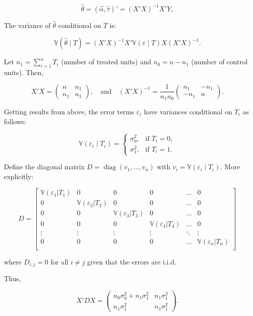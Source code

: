 \documentclass{article}
\begin{document}
\[
\hat{\theta} = (\hat{\alpha}, \hat{\tau})' = (X'X)^{-1} X'Y,
\]

The variance of \(\hat{\theta}\) conditional on \(T\) is:

\[
\mathbb{V}(\hat{\theta} \mid T) = (X'X)^{-1} X' \mathbb{V}(\varepsilon \mid T) X (X'X)^{-1}.
\]

Let \(n_1 = \sum_{i=1}^n T_i\) (number of treated units) and \(n_0 = n - n_1\) (number of control units). Then,

\[
X'X = \begin{pmatrix}
n & n_1 \\
n_1 & n_1
\end{pmatrix}, \quad \text{and} \quad (X'X)^{-1} = \frac{1}{n_1 n_0} \begin{pmatrix}
n_1 & -n_1 \\
- n_1 & n
\end{pmatrix}.
\]

Getting results from above, the error terms \(\varepsilon_i\) have variances conditional on \(T_i\) as follows:

\[
\mathbb{V}(\varepsilon_i \mid T_i) = \begin{cases}
\sigma_0^2, & \text{if } T_i = 0, \\
\sigma_1^2, & \text{if } T_i = 1.
\end{cases}
\]

Define the diagonal matrix \(D = \operatorname{diag}(v_1, \dots, v_n)\) with \(v_i = \mathbb{V}(\varepsilon_i \mid T_i)\). More explicitly:

$$
D = \left[
\begin{matrix}
\mathbb{V}(\varepsilon_1 | T_1) & 0 & 0 & 0 & \ldots & 0 \\
0 & \mathbb{V}(\varepsilon_2 | T_2) & 0 & 0 & \ldots & 0 \\
0 & 0 & \mathbb{V}(\varepsilon_3 | T_3) & 0 & \ldots & 0 \\
0 & 0 & 0 & \mathbb{V}(\varepsilon_4 | T_4) & \ldots & 0 \\
\vdots & \vdots & \vdots & \vdots & \ddots & \vdots \\
0 & 0 & 0 & 0 & \ldots & \mathbb{V}(\varepsilon_n | T_n) \\
\end{matrix}
\right]
$$

where $D_{i, j} = 0$ for all $i \neq j$ given that the errors are i.i.d.

Thus,

\[
X' D X = \begin{pmatrix}
n_0 \sigma_0^2 + n_1 \sigma_1^2 & n_1 \sigma_1^2 \\
n_1 \sigma_1^2 & n_1 \sigma_1^2
\end{pmatrix}.
\]
\end{document}
